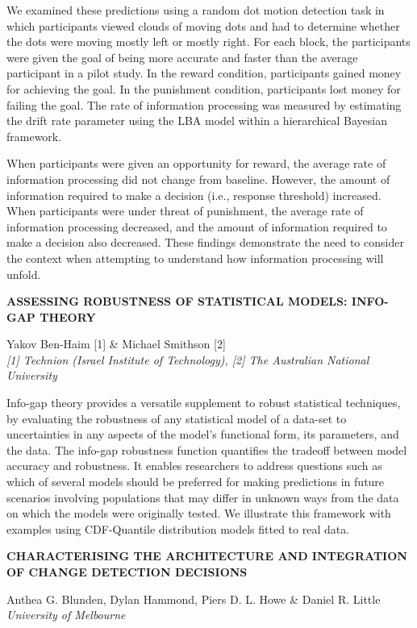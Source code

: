 \documentclass[]{article}
\begin{document}
We examined these predictions using a random dot motion detection task
in which participants viewed clouds of moving dots and had to determine
whether the dots were moving mostly left or mostly right. For each
block, the participants were given the goal of being more accurate and
faster than the average participant in a pilot study. In the reward
condition, participants gained money for achieving the goal. In the
punishment condition, participants lost money for failing the goal. The
rate of information processing was measured by estimating the drift rate
parameter using the LBA model within a hierarchical Bayesian framework.

When participants were given an opportunity for reward, the average rate
of information processing did not change from baseline. However, the
amount of information required to make a decision (i.e., response
threshold) increased. When participants were under threat of punishment,
the average rate of information processing decreased, and the amount of
information required to make a decision also decreased. These findings
demonstrate the need to consider the context when attempting to
understand how information processing will unfold.\\
\pagebreak  

\textbf{ASSESSING ROBUSTNESS OF STATISTICAL MODELS: INFO-GAP THEORY}

Yakov Ben-Haim {[}1{]} \& Michael Smithson {[}2{]}\\
\emph{{[}1{]} Technion (Israel Institute of Technology), {[}2{]} The
Australian National University}

Info-gap theory provides a versatile supplement to robust statistical
techniques, by evaluating the robustness of any statistical model of a
data-set to uncertainties in any aspects of the model's functional form,
its parameters, and the data. The info-gap robustness function
quantifies the tradeoff between model accuracy and robustness. It
enables researchers to address questions such as which of several models
should be preferred for making predictions in future scenarios involving
populations that may differ in unknown ways from the data on which the
models were originally tested. We illustrate this framework with
examples using CDF-Quantile distribution models fitted to real data.\\
\pagebreak  

\textbf{CHARACTERISING THE ARCHITECTURE AND INTEGRATION OF CHANGE
DETECTION DECISIONS}

Anthea G. Blunden, Dylan Hammond, Piers D. L. Howe \& Daniel R. Little\\
\emph{University of Melbourne}
\end{document}
